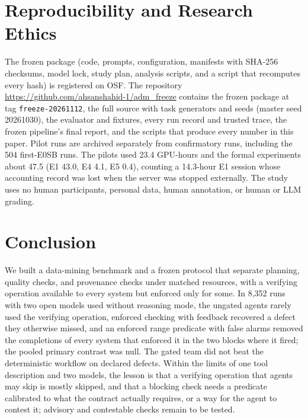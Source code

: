 \documentclass[conference]{IEEEtran}
\begin{document}
\section{Reproducibility and Research Ethics}
The frozen package (code, prompts, configuration, manifests with SHA-256 checksums, model lock, study plan, analysis
scripts, and a script that recomputes every hash) is registered on OSF. The repository
\url{https://github.com/ahsanshahid-1/adm_freeze} contains the frozen package at tag \texttt{freeze-20261112}, the
full source with task generators and seeds (master seed 20261030), the evaluator and fixtures, every run record and
trusted trace, the frozen pipeline's final report, and the scripts that produce every number in this paper. Pilot runs are archived separately from confirmatory runs, including the 504
first-E0SB runs. The pilots used 23.4 GPU-hours and the formal experiments about 47.5 (E1 43.0, E4 4.1, E5 0.4), counting
a 14.3-hour E1 session whose accounting record was lost when the server was stopped externally. The study uses no human participants, personal data, human
annotation, or human or LLM grading.

\section{Conclusion}
We built a data-mining benchmark and a frozen protocol that separate planning, quality checks, and provenance checks
under matched resources, with a verifying operation available to every system but enforced only for some. In 8,352
runs with two open models used without reasoning mode, the ungated agents rarely used the verifying operation,
enforced checking with feedback recovered a defect they otherwise missed, and an enforced range predicate with false
alarms removed the completions of every system that enforced it in the two blocks where it fired; the pooled primary
contrast was null. The gated team did not beat the deterministic workflow on declared defects. Within the limits of
one tool description and two models, the lesson is that a verifying operation that agents may skip is mostly
skipped, and that a blocking check needs a predicate calibrated to what the contract actually requires, or a way for
the agent to contest it; advisory and contestable checks remain to be tested.
\end{document}
